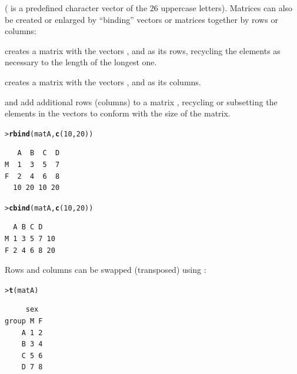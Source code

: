 \documentclass[10pt,krantz2]{krantz}\usepackage[]{graphicx}\usepackage[]{color}
\makeatletter
\newcommand{\hlnum}[1]{\textcolor[rgb]{0.686,0.059,0.569}{#1}}%
\newcommand{\hlstd}[1]{\textcolor[rgb]{0.345,0.345,0.345}{#1}}%
\newcommand{\hlkwd}[1]{\textcolor[rgb]{0.737,0.353,0.396}{\textbf{#1}}}%
\newenvironment{kframe}{%
 \def\at@end@of@kframe{}%
 \ifinner\ifhmode%
  \def\at@end@of@kframe{\end{minipage}}%
  \begin{minipage}{\columnwidth}%
 \fi\fi%
 \def\FrameCommand##1{\hskip\@totalleftmargin \hskip-\fboxsep
 \colorbox{shadecolor}{##1}\hskip-\fboxsep
     \hskip-\linewidth \hskip-\@totalleftmargin \hskip\columnwidth}%
 \MakeFramed {\advance\hsize-\width
   \@totalleftmargin\z@ \linewidth\hsize
   \@setminipage}}%
 {\par\unskip\endMakeFramed%
 \at@end@of@kframe}
\newenvironment{knitrout}{}{} %
\renewenvironment{knitrout}{\small\renewcommand{\baselinestretch}{.85}}{} %
\makeatother
\begin{document}
\noindent ( is a predefined character 
vector of the 26 uppercase letters).
Matrices can also be created or enlarged by ``binding'' vectors or matrices together
by rows or columns:
\begin{itemize*}
  \item {} creates a matrix with the vectors ,  and  as its rows, recycling the elements as necessary to the length of the longest one.
  \item {} creates a matrix with the vectors ,  and  as its columns.
  \item {} and  add additional
  rows (columns) to a matrix , recycling or subsetting the elements in the
  vectors to conform with the size of the matrix.
\end{itemize*}

\begin{knitrout}
\color{fgcolor}\begin{kframe}
\begin{alltt}
\hlstd{> }\hlkwd{rbind}\hlstd{(matA,} \hlkwd{c}\hlstd{(}\hlnum{10}\hlstd{,} \hlnum{20}\hlstd{))}
\end{alltt}
\begin{verbatim}
   A  B  C  D
M  1  3  5  7
F  2  4  6  8
  10 20 10 20
\end{verbatim}
\begin{alltt}
\hlstd{> }\hlkwd{cbind}\hlstd{(matA,} \hlkwd{c}\hlstd{(}\hlnum{10}\hlstd{,} \hlnum{20}\hlstd{))}
\end{alltt}
\begin{verbatim}
  A B C D   
M 1 3 5 7 10
F 2 4 6 8 20
\end{verbatim}
\end{kframe}
\end{knitrout}

\noindent Rows and columns can be swapped (transposed)
using :

\begin{knitrout}
\color{fgcolor}\begin{kframe}
\begin{alltt}
\hlstd{> }\hlkwd{t}\hlstd{(matA)}
\end{alltt}
\begin{verbatim}
     sex
group M F
    A 1 2
    B 3 4
    C 5 6
    D 7 8
\end{verbatim}
\end{kframe}
\end{knitrout}
\end{document}
